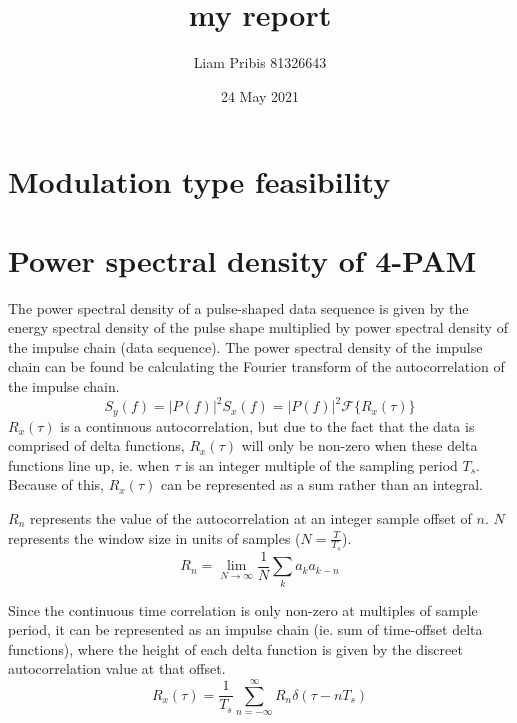 \documentclass[11pt]{article}
\title{my report}
\author{Liam Pribis 81326643}
\date{24 May 2021}
\begin{document}

\newpage
\section{Modulation type feasibility}
\section{Power spectral density of 4-PAM}\label{rect_psd_section}
The power spectral density of a pulse-shaped data sequence is given by the
energy spectral density of the pulse shape multiplied by power spectral density
of the impulse chain (data sequence). The power spectral density of the impulse
chain can be found be calculating the Fourier transform of the autocorrelation
of the impulse chain.
\begin{equation}
    S_y(f) = |P(f)|^2S_x(f) = |P(f)|^2 \mathcal{F} \{ R_x(\tau) \}
\end{equation}
$R_x(\tau)$ is a continuous autocorrelation, but due to the fact that the data
is comprised of delta functions, $R_x(\tau)$ will only be non-zero when these
delta functions line up, ie. when $\tau$ is an integer multiple of the sampling
period $T_s$. Because of this, $R_x(\tau)$ can be represented as a sum rather
than an integral.

$R_n$ represents the value of the autocorrelation at an integer sample offset of
$n$. $N$ represents the window size in units of samples ($N = \frac{T}{T_s}$).
\begin{equation}\label{rn}
    R_n = \lim_{N \to \infty}  \frac{1}{N} \sum_{k} a_k a_{k-n}
\end{equation}

Since the continuous time correlation is only non-zero at multiples of sample
period, it can be represented as an impulse chain (ie. sum of time-offset delta
functions), where the height of each delta function is given by the discreet
autocorrelation value at that offset.
\begin{equation}\label{autocorr}
    R_x(\tau) = \frac{1}{T_s} \sum_{n=-\infty}^{\infty} R_n \delta(\tau - nT_s)
\end{equation}
\end{document}
